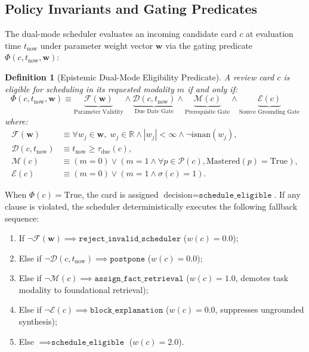 \documentclass[11pt,a4paper]{article}
\newtheorem{definition}{Definition}
\begin{document}
\subsection{Policy Invariants and Gating Predicates}
The dual-mode scheduler evaluates an incoming candidate card $c$ at evaluation time $t_{\text{now}}$ under parameter weight vector $\mathbf{w}$ via the gating predicate $\Phi(c, t_{\text{now}}, \mathbf{w})$:
\begin{definition}[Epistemic Dual-Mode Eligibility Predicate]
\label{def:predicate}
A review card $c$ is eligible for scheduling in its requested modality $m$ if and only if:
\begin{equation}
    \label{eq:predicate}
    \Phi(c, t_{\text{now}}, \mathbf{w}) \equiv \underbrace{\mathcal{F}(\mathbf{w})}_{\text{Parameter Validity}} \land \underbrace{\mathcal{D}(c, t_{\text{now}})}_{\text{Due Date Gate}} \land \underbrace{\mathcal{M}(c)}_{\text{Prerequisite Gate}} \land \underbrace{\mathcal{E}(c)}_{\text{Source Grounding Gate}}
\end{equation}
where:
\begin{align}
    \mathcal{F}(\mathbf{w}) &\equiv \forall w_j \in \mathbf{w}, \; w_j \in \mathbb{R} \land |w_j| < \infty \land \neg\text{isnan}(w_j), \\
    \mathcal{D}(c, t_{\text{now}}) &\equiv t_{\text{now}} \ge \tau_{\text{due}}(c), \\
    \mathcal{M}(c) &\equiv (m=0) \lor (m=1 \land \forall p \in \mathcal{P}(c), \text{Mastered}(p) = \text{True}), \\
    \mathcal{E}(c) &\equiv (m=0) \lor (m=1 \land \sigma(c) = 1).
\end{align}
\end{definition}

When $\Phi(c) = \text{True}$, the card is assigned $\text{decision} = \texttt{schedule\_eligible}$. If any clause is violated, the scheduler deterministically executes the following fallback sequence:
\begin{enumerate}
    \item If $\neg\mathcal{F}(\mathbf{w}) \implies \texttt{reject\_invalid\_scheduler}$ ($w(c) = 0.0$);
    \item Else if $\neg\mathcal{D}(c, t_{\text{now}}) \implies \texttt{postpone}$ ($w(c) = 0.0$);
    \item Else if $\neg\mathcal{M}(c) \implies \texttt{assign\_fact\_retrieval}$ ($w(c) = 1.0$, demotes task modality to foundational retrieval);
    \item Else if $\neg\mathcal{E}(c) \implies \texttt{block\_explanation}$ ($w(c) = 0.0$, suppresses ungrounded synthesis);
    \item Else $\implies \texttt{schedule\_eligible}$ ($w(c) = 2.0$).
\end{enumerate}
\end{document}
